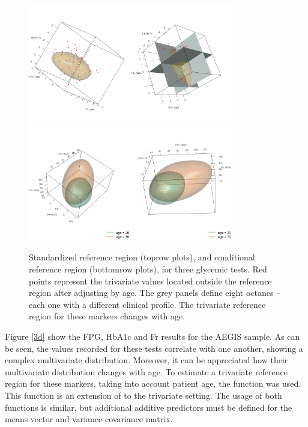 \begin{figure}[!htb]
	\centering
	\includegraphics[width=0.8\textwidth]{Fig6.1.png}
	\includegraphics[width=0.8\textwidth]{Fig6.2.png}
	\caption{Standardized reference region (toprow plots), and conditional reference region (bottomrow plots), for three glycemic tests. Red points represent the trivariate values located outside the reference region after adjusting by age. The grey panels define eight octanes -- each one with a different clinical profile. The trivariate reference region for these markers changes with age.}
	\label{triv_res}
\end{figure}

Figure \ref{3d} show the FPG, HbA1c and Fr results for the AEGIS sample. As can be seen, the values recorded for these tests correlate with one another, showing a complex multivariate distribution. Moreover, it can be appreciated how their multivariate distribution changes with age. To estimate a trivariate reference region for these markers, taking into account patient age, the  function was used. This function is an extension of  to the trivariate setting. The usage of both functions is similar, but additional additive predictors must be defined for the means vector and variance-covariance matrix.





